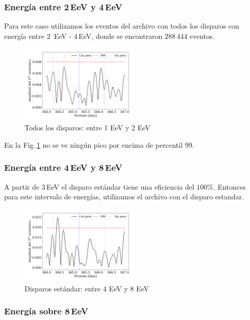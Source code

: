 \subsubsection{Energía entre 2\,EeV y 4\,EeV}

Para este caso utilizamos los eventos del archivo con todos los disparos con energía entre $2\,$ EeV - $4\,$EeV, donde se encontraron $288\,444$ eventos.
\begin{figure}[H]
	\centering
	\includegraphics[width=0.5\textwidth]{2019_AllTriggers_2_4_EeV_con_vs_sin_peso.png}
	\caption{Todos los disparos: entre 1 EeV y 2 EeV}
	\label{fig:24w}
\end{figure}

En la Fig.\,\ref{fig:24w} no se ve ningún pico por encima de  percentil 99.


\subsubsection{Energía entre 4\,EeV y 8\,EeV}

A partir de $3\,$EeV el disparo estándar tiene una eficiencia del $100\%$. Entonces para este  intervalo de energías,  utilizamos el archivo con el disparo estandar.

\begin{figure}[H]
	\centering
	\includegraphics[width=0.5\textwidth]{2019_Main_Array_4_8_EeV_con_vs_sin_peso.png}
	\caption{Disparos estándar: entre 4 EeV y 8 EeV}
	\label{fig:48w}
\end{figure}

\subsubsection{Energía sobre 8\,EeV}

